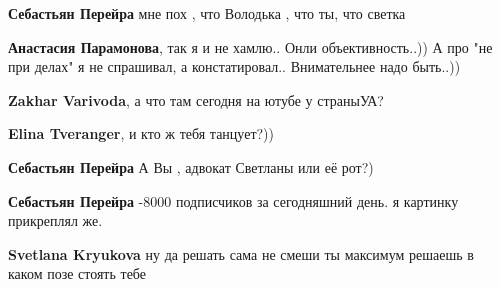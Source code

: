 \begin{itemize}
\begin{itemize}
\textbf{Себастьян Перейра} мне пох , что Володька , что ты, что светка

 
\textbf{Анастасия Парамонова}, так я и не хамлю.. Онли объективность..)) А про "не при делах" я не спрашивал, а констатировал.. Внимательнее надо быть..))

 
\textbf{Zakhar Varivoda}, а что там сегодня на ютубе у страныУА?

 
\textbf{Elina Tveranger}, и кто ж тебя танцует?))

 
\textbf{Себастьян Перейра} А Вы , адвокат Светланы или её рот?)

 
\textbf{Себастьян Перейра} -8000 подписчиков за сегодняшний день. я картинку прикреплял же.

 
\textbf{Svetlana Kryukova} ну да решать сама не смеши ты максимум решаешь в каком позе стоять тебе

 

\end{itemize}
\end{itemize}
